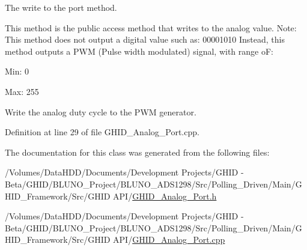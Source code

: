 \-The write to the port method. 

\-This method is the public access method that writes to the analog value. \-Note\-: \-This method does not output a digital value such as\-: 00001010 \-Instead, this method outputs a \-P\-W\-M (\-Pulse width modulated) signal, with range o\-F\-:
\begin{DoxyItemize}
\item \-Min\-: 0
\item \-Max\-: 255 
\end{DoxyItemize}\-Write the analog duty cycle to the \-P\-W\-M generator. 

\-Definition at line 29 of file \-G\-H\-I\-D\-\_\-\-Analog\-\_\-\-Port.\-cpp.



\-The documentation for this class was generated from the following files\-:\begin{DoxyCompactItemize}
\item 
/\-Volumes/\-Data\-H\-D\-D/\-Documents/\-Development Projects/\-G\-H\-I\-D -\/ Beta/\-G\-H\-I\-D/\-B\-L\-U\-N\-O\-\_\-\-Project/\-B\-L\-U\-N\-O\-\_\-\-A\-D\-S1298/\-Src/\-Polling\-\_\-\-Driven/\-Main/\-G\-H\-I\-D\-\_\-\-Framework/\-Src/\-G\-H\-I\-D A\-P\-I/\hyperlink{_g_h_i_d___analog___port_8h}{\-G\-H\-I\-D\-\_\-\-Analog\-\_\-\-Port.\-h}\item 
/\-Volumes/\-Data\-H\-D\-D/\-Documents/\-Development Projects/\-G\-H\-I\-D -\/ Beta/\-G\-H\-I\-D/\-B\-L\-U\-N\-O\-\_\-\-Project/\-B\-L\-U\-N\-O\-\_\-\-A\-D\-S1298/\-Src/\-Polling\-\_\-\-Driven/\-Main/\-G\-H\-I\-D\-\_\-\-Framework/\-Src/\-G\-H\-I\-D A\-P\-I/\hyperlink{_g_h_i_d___analog___port_8cpp}{\-G\-H\-I\-D\-\_\-\-Analog\-\_\-\-Port.\-cpp}\end{DoxyCompactItemize}

